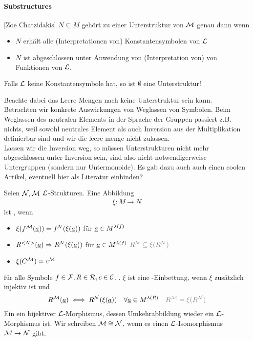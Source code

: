 \paragraph{Substructures}[Zoe Chatzidakis]
$N \subseteq M$ gehört zu einer Unterstruktur von $\mathcal M$ genau dann wenn
\begin{itemize}
	\item $N$ erhält alle (Interpretationen von) Konstantensymbolen von $\LL$
	\item $N$ ist abgeschlossen unter Anwendung von (Interpretation  von) von Funktionen von $\LL$.
\end{itemize}
Falls $\LL$ keine Konstantensymbole hat, so ist $\emptyset$ eine Unterstruktur!
\begin{*remark}[Fehm]
	Beachte dabei das Leere Mengen nach  keine Unterstruktur sein kann.\\ Betrachten wir konkrete Auswirkungen von Weglassen von Symbolen. Beim Weglassen des neutralen Elements in der Sprache der Gruppen passiert z.B. nichts, weil sowohl neutrales Element als auch Inversion aus der Multiplikation definierbar sind und wir die leere menge nicht zulassen.\\
	Lassen wir die Inversion weg, so müssen Unterstrukturen nicht mehr abgeschlossen unter Inversion sein, sind also nicht notwendigerweise Untergruppen (sondern nur Untermonoide).
	Es gab dazu auch auch einen coolen Artikel, eventuell hier als Literatur einbinden? 
\end{*remark}
\begin{definition}[$\LL$-Morphismus]
	Seien $\mathcal N, \mathcal M$ $\LL$-Strukturen. Eine Abbildung
	\begin{align*}
		\xi \colon M \to N
	\end{align*}
	ist , wenn 
	\begin{itemize}
		\item $\xi(f^{\mathcal M}(\underline{a})) = f^{\mathcal N}(\xi(\underline{a}))$ für $\underline{a} \in M^{\lambda(f)}$
		\item $R^{<N>}(\underline{a}) \Rightarrow R^{\mathcal N}(\xi(\underline{a}))$ für $\underline{a} \in M^{\lambda(f)}$   $\marganote{R^{\NN}\subseteq \xi(R^{\NN})}$
		\item $\xi(C^{\mathcal M}) = c^{\mathcal M}$
	\end{itemize}
	für alle Symbole $f \in \mathcal F, R \in \mathcal R, c \in \mathcal C$. . $\xi$ ist eine \begriff{$\LL$}-Einbettung, wenn $\xi$ zusätzlich injektiv ist und 
	\begin{align*}
		R^{\MM}(\ul{a}) \iff R^{\NN}(\xi(\ul{a})) \quad \forall \ul{a}\in M^{\arity(R)}\quad \marganote{R^{\MM} = \xi(R^{\NN})}
	\end{align*}
	Ein  ein bijektiver $\LL$-Morphismus, dessen Umkehrabbildung wieder ein $\LL$-Morphismus ist. Wir schreiben $\mathcal M \cong \mathcal N$, wenn es einen $\LL$-Isomorphismus $\mathcal M \to \mathcal N$ gibt.
\end{definition}
